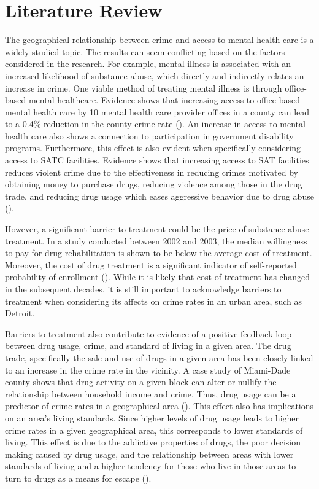 \documentclass[12pt]{article}
\begin{document}
\section{Literature Review} \label{sec:literature}
The geographical relationship between crime and access to mental health care is a widely studied topic. The results can seem conflicting based on the factors considered in the research.  For example, mental illness is associated with an increased likelihood of substance abuse, which directly and indirectly relates an increase in crime. One viable method of treating mental illness is through office-based mental healthcare. Evidence shows that increasing access to office-based mental health care by 10 mental health care provider offices in a county can lead to a 0.4\% reduction in the county crime rate (\cite{mental_healthcare_and_crime}). An increase in access to mental health care also shows a connection to participation in government disability programs. Furthermore, this effect is also evident when specifically considering access to SATC facilities. Evidence shows that increasing access to SAT facilities reduces violent crime due to the effectiveness in reducing crimes motivated by obtaining money to purchase drugs, reducing violence among those in the drug trade, and reducing drug usage which eases aggressive behavior due to drug abuse (\cite{SAT_centers_and_crime}). 

However, a significant barrier to treatment could be the price of substance abuse treatment. In a study conducted between 2002 and 2003, the median willingness to pay for drug rehabilitation is shown to be below the average cost of treatment. Moreover, the cost of drug treatment is a significant indicator of self-reported probability of enrollment (\cite{cost_of_drug_treatment}). While it is likely that cost of treatment has changed in the subsequent decades, it is still important to acknowledge barriers to treatment when considering its affects on crime rates in an urban area, such as Detroit. 

Barriers to  treatment also contribute to evidence of a positive feedback loop between drug usage, crime, and standard of living in a given area. The drug trade, specifically the sale and use of drugs in a given area has been closely linked to an increase in the crime rate in the vicinity. A case study of Miami-Dade county shows that drug activity on a given block can alter or nullify the relationship between household income and crime. Thus, drug usage can be a predictor of crime rates in a geographical area (\cite{drugs_crime_space_time}). This effect also has implications on an area's living standards. Since higher levels of drug usage leads to higher crime rates in a given geographical area, this corresponds to lower standards of living. This effect is due to the addictive properties of drugs, the poor decision making caused by drug usage, and the relationship between areas with lower standards of living and a higher tendency for those who live in those areas to turn to drugs as a means for escape (\cite{drugs_and_crime}).
\end{document}

